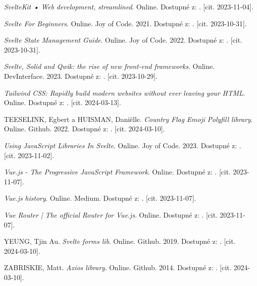 \begin{thebibliography}{99}
\emph{SvelteKit • Web development, streamlined}. Online. Dostupné z: . [cit. 2023-11-04].

\emph{Svelte For Beginners}. Online. Joy of Code. 2021. Dostupné z: . [cit. 2023-10-31].

\emph{Svelte State Management Guide}. Online. Joy of Code. 2022. Dostupné z: . [cit. 2023-10-31].

\emph{Svelte, Solid and Qwik: the rise of new front-end frameworks}. Online. DevInterface. 2023. Dostupné z: . [cit. 2023-10-29].

\emph{Tailwind CSS: Rapidly build modern websites without ever leaving your HTML}. Online. Dostupné z: . [cit. 2024-03-13].

\textsc{TEESELINK}, Egbert a \textsc{HUISMAN}, Daniëlle. \emph{Country Flag Emoji Polyfill library}. Online. Github. 2022. Dostupné z: . [cit. 2024-03-10].

\emph{Using JavaScript Libraries In Svelte}. Online. Joy of Code. 2023. Dostupné z: . [cit. 2023-11-02].

\emph{Vue.js - The Progressive JavaScript Framework}. Online. Dostupné z: . [cit. 2023-11-07].

\emph{Vue.js history}. Online. Medium. Dostupné z: . [cit. 2023-11-07].

\emph{Vue Router | The official Router for Vue.js}. Online. Dostupné z: . [cit. 2023-11-07].

\textsc{YEUNG}, Tjin Au. \emph{Svelte forms lib}. Online. Github. 2019. Dostupné z: . [cit. 2024-03-10].

\textsc{ZABRISKIE}, Matt. \emph{Axios library}. Online. Github. 2014. Dostupné z: . [cit. 2024-03-10].


\end{thebibliography}
